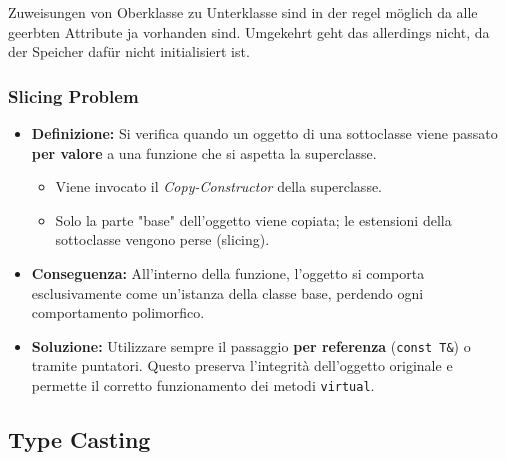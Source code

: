 Zuweisungen von Oberklasse zu Unterklasse sind in der regel möglich da alle geerbten Attribute ja vorhanden sind. 
Umgekehrt geht das allerdings nicht, da der Speicher dafür nicht initialisiert ist.

\subsubsection{Slicing Problem}

\begin{itemize}
    \item \textbf{Definizione:} Si verifica quando un oggetto di una sottoclasse viene passato \textbf{per valore} a una funzione che si aspetta la superclasse.
    \begin{itemize}
        \item Viene invocato il \textit{Copy-Constructor} della superclasse.
        \item Solo la parte "base" dell'oggetto viene copiata; le estensioni della sottoclasse vengono perse (slicing).
    \end{itemize}
    \item \textbf{Conseguenza:} All'interno della funzione, l'oggetto si comporta esclusivamente come un'istanza della classe base, perdendo ogni comportamento polimorfico.
    \item \textbf{Soluzione:} Utilizzare sempre il passaggio \textbf{per referenza} (\texttt{const T\&}) o tramite puntatori. Questo preserva l'integrità dell'oggetto originale e permette il corretto funzionamento dei metodi \texttt{virtual}.
\end{itemize}

\subsection{Type Casting}\vspace{-1em}

